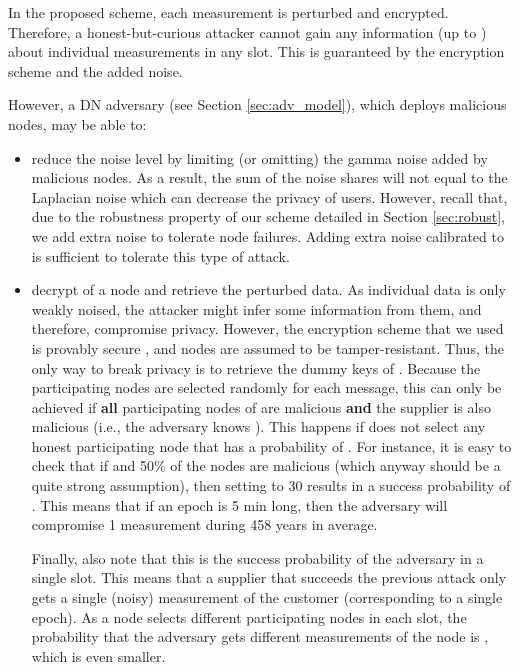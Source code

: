 \documentclass[11pt,a4paper]{article}
\theoremstyle{plain}
\theoremstyle{plain}
\theoremstyle{plain}
\theoremstyle{plain}
\theoremstyle{nonumberplain} \theoremseparator{}
\begin{document}
In the proposed scheme, each measurement is perturbed and encrypted. 
Therefore, a honest-but-curious attacker cannot
gain any information (up to ) about individual measurements in any slot. This is guaranteed by the encryption scheme and the added noise. 

However, a DN adversary (see Section \ref{sec:adv_model}), which deploys  malicious nodes, may be able to:
\begin{itemize}
\item reduce the noise level by limiting (or omitting) the gamma noise added by
malicious nodes. As a result, the sum of the noise shares will not 
equal to the Laplacian noise which can decrease the privacy of users.
However, recall that, due to the robustness property of our scheme detailed in Section \ref{sec:robust}, we
add extra noise to tolerate  node failures. Adding extra noise calibrated to  is sufficient to tolerate this type of attack.

\item decrypt  of a node  and retrieve the perturbed data. 
As individual data is only weakly noised, the attacker might infer 
some information from them, and therefore, compromise privacy. 
However, the encryption scheme that we used is provably 
secure  \cite{cc05mobiquitous}, and nodes are assumed to be tamper-resistant. 
Thus, the only way to break privacy is to retrieve the dummy keys of .
Because the participating nodes are selected randomly for each message, 
this can only be achieved if {\bf all} participating nodes of  are
malicious {\bf and} the supplier is also malicious (i.e., the adversary knows ). This happens if  does not select any honest participating node that has a probability of . For instance, it is easy to check that if  and 50\% of the nodes are malicious (which anyway should be a quite strong assumption), then setting  to 30 results in a success probability of . This means that if an epoch is 5 min long, then the adversary will compromise 1 measurement during 458 years in average. 


Finally, also note that this is the success probability of the adversary in a single slot. This means that a supplier that succeeds the previous attack only gets a single (noisy) measurement of 
the customer (corresponding to a single epoch). As a node selects different participating nodes in each slot, 
the probability that the adversary gets  different measurements of the node is , which is even smaller.
\end{itemize}
\end{document}
